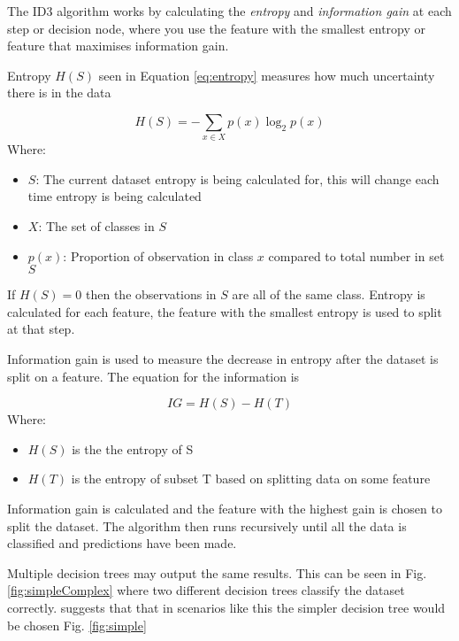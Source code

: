 The ID3 algorithm works by calculating the \textit{entropy} and \textit{information gain} at each step or decision node, where you use the feature with the smallest entropy or feature that maximises information gain.

Entropy $H(S)$ seen in Equation \ref{eq:entropy} measures how much uncertainty there is in the data \citep{shannon_mathematical_2001}

\begin{equation} \label{eq:entropy}
	H(S) = - \sum_{x \in X} p(x) \log_{2} p(x)
\end{equation}
Where:
\begin{itemize}[label=]
	\item $S$: The current dataset entropy is being calculated for, this will change each time entropy is being calculated
	\item $X$: The set of classes in $S$
	\item $p(x)$: Proportion of observation in class $x$ compared to total number in set $S$
\end{itemize}
If $H(S) = 0$ then the observations in $S$ are all of the same class. Entropy is calculated for each feature, the feature with the smallest entropy is used to split at that step.

Information gain is used to measure the decrease in entropy after the dataset is split on a feature. The equation for the information is 

\begin{equation} \label{eq:infoGain}
	IG = H(S) -  H(T)
\end{equation}
Where:
\begin{itemize}[label=]
	\item $H(S)$ is the the entropy of S
	\item $H(T)$ is the entropy of subset T based on splitting data on some feature
\end{itemize}

Information gain is calculated and the feature with the highest gain is chosen to split the dataset. The algorithm then runs recursively until all the data is classified and predictions have been made. 

Multiple decision trees may output the same results. This can be seen in Fig. \ref{fig:simpleComplex} where two different decision trees classify the dataset correctly. \cite{quinlan_induction_1986} suggests that that in scenarios like this the simpler decision tree would be chosen Fig. \ref{fig:simple}

